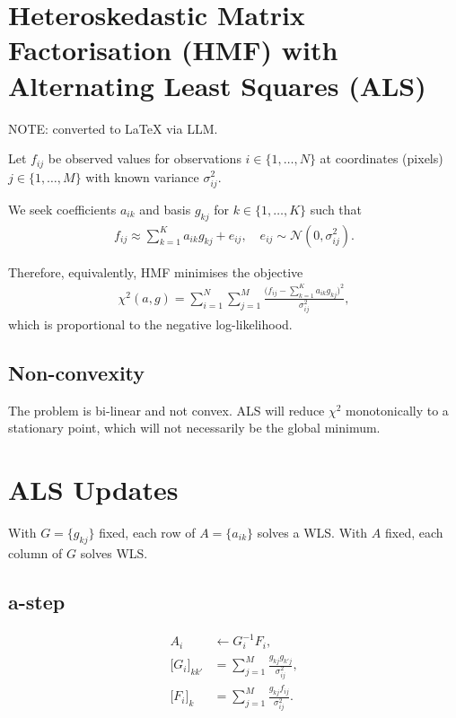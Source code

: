 \documentclass{article}
\begin{document}
\section*{Heteroskedastic Matrix Factorisation (HMF) with Alternating Least Squares (ALS)}

NOTE: converted to LaTeX via LLM.

Let $f_{ij}$ be observed values for observations $i \in \{1,\dots,N\}$ at coordinates (pixels) $j \in \{1,\dots,M\}$ with known variance $\sigma_{ij}^2$.

We seek coefficients $a_{ik}$ and basis $g_{kj}$ for $k \in \{1,\dots,K\}$ such that
\begin{align*}
    f_{ij} \approx \sum_{k=1}^K a_{ik} g_{kj} + e_{ij}, \quad e_{ij} \sim \mathcal{N}(0, \sigma_{ij}^2).
\end{align*}

Therefore, equivalently, HMF minimises the objective
\begin{align*}
    \chi^2(a,g) = \sum_{i=1}^N \sum_{j=1}^M \frac{\Big(f_{ij} - \sum_{k=1}^K a_{ik} g_{kj}\Big)^2}{\sigma_{ij}^2},
\end{align*}
which is proportional to the negative log-likelihood.

\subsection*{Non-convexity}

The problem is bi-linear and not convex. ALS will reduce $\chi^2$ monotonically to a stationary point, which will not necessarily be the global minimum.

\section*{ALS Updates}

With $G=\{g_{kj}\}$ fixed, each row of $A=\{a_{ik}\}$ solves a WLS. With $A$ fixed, each column of $G$ solves WLS.

\subsection*{a-step}

\begin{align*}
A_i &\leftarrow G_i^{-1} F_i, \\
\big[G_i\big]_{kk'} &= \sum_{j=1}^M \frac{g_{kj} g_{k'j}}{\sigma_{ij}^2}, \\
\big[F_i\big]_k &= \sum_{j=1}^M \frac{g_{kj} f_{ij}}{\sigma_{ij}^2}.
\end{align*}
\end{document}
